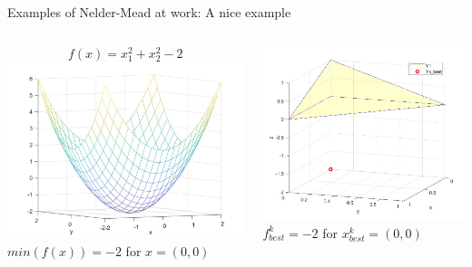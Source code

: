 \documentclass{beamer}
\begin{document}
\begin{frame}{Examples of Nelder-Mead at work: A nice example}
\begin{columns}
\begin{column}{0.49\linewidth}
	$$f(x) = x_1^2 + x_2^2 - 2$$
	\includegraphics[width=0.95\linewidth]{NiceFunctionPlot}	\\
	$min(f(x))=-2$ for $x=(0,0)$
\end{column}
\begin{column}{0.49\linewidth}
	\includegraphics[width=0.95\linewidth]{NiceFunctionSimplex}	\\
	$f^k_{best}=-2$ for $x^k_{best}=(0,0)$
\end{column}
\end{columns}
\end{frame}
\end{document}

